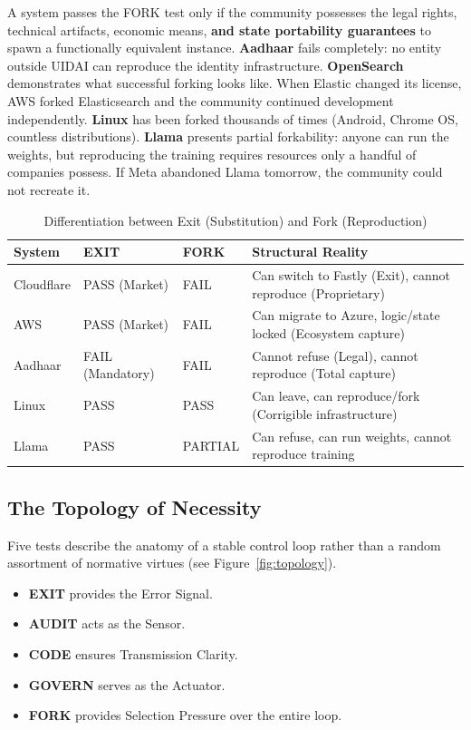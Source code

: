 A system passes the FORK test only if the community possesses the legal rights, technical artifacts, economic means, \textbf{and state portability guarantees} to spawn a functionally equivalent instance. \textbf{Aadhaar} fails completely: no entity outside UIDAI can reproduce the identity infrastructure. \textbf{OpenSearch} demonstrates what successful forking looks like. When Elastic changed its license, AWS forked Elasticsearch and the community continued development independently. \textbf{Linux} has been forked thousands of times (Android, Chrome OS, countless distributions). \textbf{Llama} presents partial forkability: anyone can run the weights, but reproducing the training requires resources only a handful of companies possess. If Meta abandoned Llama tomorrow, the community could not recreate it.

\begin{table}[htbp]
\centering
\begin{tabular}{@{}llll@{}}
\toprule
\textbf{System} & \textbf{EXIT} & \textbf{FORK} & \textbf{Structural Reality} \\
\midrule
Cloudflare & PASS (Market) & FAIL & Can switch to Fastly (Exit), cannot reproduce (Proprietary) \\
AWS & PASS (Market) & FAIL & Can migrate to Azure, logic/state locked (Ecosystem capture) \\
Aadhaar & FAIL (Mandatory) & FAIL & Cannot refuse (Legal), cannot reproduce (Total capture) \\
Linux & PASS & PASS & Can leave, can reproduce/fork (Corrigible infrastructure) \\
Llama & PASS & PARTIAL & Can refuse, can run weights, cannot reproduce training \\
\bottomrule
\end{tabular}
\caption{Differentiation between Exit (Substitution) and Fork (Reproduction)}
\end{table}

\subsection{The Topology of Necessity}

Five tests describe the anatomy of a stable control loop rather than a random assortment of normative virtues (see Figure~\ref{fig:topology}).

\begin{itemize}[noitemsep,topsep=0pt]
    \item \textbf{EXIT} provides the Error Signal.
    \item \textbf{AUDIT} acts as the Sensor.
    \item \textbf{CODE} ensures Transmission Clarity.
    \item \textbf{GOVERN} serves as the Actuator.
    \item \textbf{FORK} provides Selection Pressure over the entire loop.
\end{itemize}

